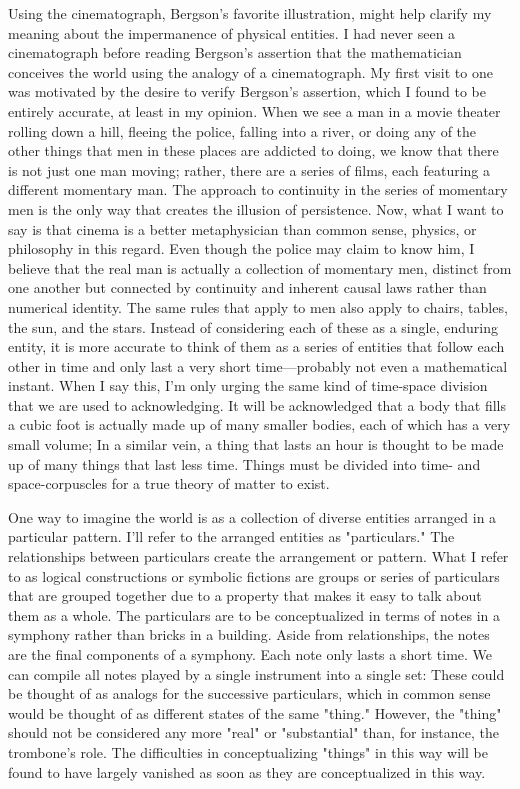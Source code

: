 \documentclass[a4paper,12pt]{book}[2004/02/16]
\theoremstyle{ilemma}
\theoremstyle{itheorem}
\theoremstyle{iother}
\theoremstyle{icorollary}
\theoremstyle{numcorollary}
\theoremstyle{idefinition}
\begin{document}
Using the cinematograph, Bergson's favorite illustration, might help clarify my meaning about the impermanence of physical entities. I had never seen a cinematograph before reading Bergson's assertion that the mathematician conceives the world using the analogy of a cinematograph. My first visit to one was motivated by the desire to verify Bergson's assertion, which I found to be entirely accurate, at least in my opinion.
When we see a man in a movie theater rolling down a hill, fleeing the police, falling into a river, or doing any of the other things that men in these places are addicted to doing, we know that there is not just one man moving; rather, there are a series of films, each featuring a different momentary man. The approach to continuity in the series of momentary men is the only way that creates the illusion of persistence. Now, what I want to say is that cinema is a better metaphysician than common sense, physics, or philosophy in this regard. Even though the police may claim to know him, I believe that the real man is actually a collection of momentary men, distinct from one another but connected by continuity and inherent causal laws rather than numerical identity. The same rules that apply to men also apply to chairs, tables, the sun, and the stars.
Instead of considering each of these as a single, enduring entity, it is more accurate to think of them as a series of entities that follow each other in time and only last a very short time—probably not even a mathematical instant. When I say this, I'm only urging the same kind of time-space division that we are used to acknowledging. It will be acknowledged that a body that fills a cubic foot is actually made up of many smaller bodies, each of which has a very small volume; In a similar vein, a thing that lasts an hour is thought to be made up of many things that last less time. Things must be divided into time- and space-corpuscles for a true theory of matter to exist.

One way to imagine the world is as a collection of diverse entities arranged in a particular pattern. I'll refer to the arranged entities as "particulars." The relationships between particulars create the arrangement or pattern. What I refer to as logical constructions or symbolic fictions are groups or series of particulars that are grouped together due to a property that makes it easy to talk about them as a whole. The particulars are to be conceptualized in terms of notes in a symphony rather than bricks in a building. Aside from relationships, the notes are the final components of a symphony. Each note only lasts a short time. We can compile all notes played by a single instrument into a single set:
These could be thought of as analogs for the successive particulars, which in common sense would be thought of as different states of the same "thing."
However, the "thing" should not be considered any more "real" or "substantial" than, for instance, the trombone's role. The difficulties in conceptualizing "things" in this way will be found to have largely vanished as soon as they are conceptualized in this way.
\end{document}
